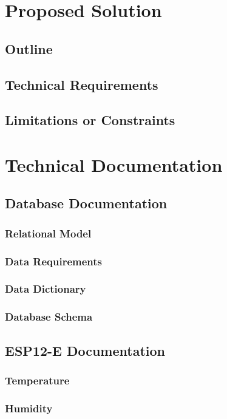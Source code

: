 \documentclass[a4paper,12pt,headings=normal]{article}
\begin{document}
    \newpage
    \section{Proposed Solution}
        \subsection{Outline}
        \subsection{Technical Requirements}
        \subsection{Limitations or Constraints}

    \newpage
    \section{Technical Documentation}
        \subsection{Database Documentation}
            \subsubsection{Relational Model}
            \subsubsection{Data Requirements}
            \subsubsection{Data Dictionary}
            \subsubsection{Database Schema}

        \newpage
        \subsection{ESP12-E Documentation}
            \subsubsection{Temperature}
            \subsubsection{Humidity}
\end{document}
